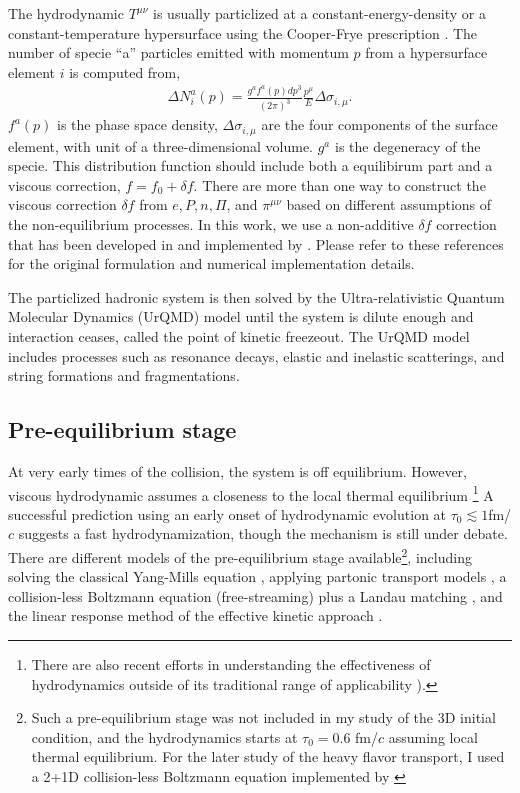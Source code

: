 The hydrodynamic $T^{\mu\nu}$ is usually particlized at a constant-energy-density or a constant-temperature hypersurface using the Cooper-Frye prescription \cite{PhysRevD.10.186}.
The number of specie ``a'' particles emitted with momentum $p$ from a hypersurface element $i$ is computed from,
\begin{eqnarray}
\Delta N_i^a(p) = \frac{g^a f^a(p) dp^3}{(2\pi)^3}  \frac{p^{\mu}}{E} \Delta \sigma_{i,\mu}.
\end{eqnarray}
$f^a(p)$ is the phase space density, $\Delta \sigma_{i,\mu}$ are the four components of the surface element, with unit of a three-dimensional volume. 
$g^a$ is the degeneracy of the specie.
This distribution function should include both a equilibirum part and a viscous correction, $f = f_0 + \delta f$.
There are more than one way to construct the viscous correction $\delta f$  from $e, P, n, \Pi$, and $\pi^{\mu\nu}$ based on different assumptions of the non-equilibrium processes.
In this work, we use a non-additive $\delta f$ correction that has been developed in \cite{Pratt:2010jt,Pratt:2014vja} and implemented by \cite{Bernhard:2018hnz}.
Please refer to these references for the original formulation and numerical implementation details.

The particlized hadronic system is then solved by the Ultra-relativistic Quantum Molecular Dynamics (UrQMD) model \cite{Bass:1998ca,Bleicher:1999xi} until the system is dilute enough and interaction ceases, called the point of kinetic freezeout. 
The UrQMD model includes processes such as resonance decays, elastic and inelastic scatterings, and string formations and fragmentations.

\subsection{Pre-equilibrium stage}
At very early times of the collision, the system is off equilibrium. 
However, viscous hydrodynamic assumes a closeness to the local thermal equilibrium \footnote{\singlespacing There are also recent efforts in understanding the effectiveness of hydrodynamics outside of its traditional range of applicability \cite{PhysRevLett.115.072501,Romatschke:2017vte,Strickland:2019jut}).}
A successful prediction using an early onset of hydrodynamic evolution at $\tau_0\lesssim 1$fm/$c$ suggests a fast hydrodynamization, though the mechanism is still under debate. 
There are different models of the pre-equilibrium stage available\footnote{\singlespacing  Such a pre-equilibrium stage was not included in my study of the 3D initial condition, and the hydrodynamics starts at $\tau_0 = 0.6$ fm/$c$ assuming local thermal equilibrium. For the later study of the heavy flavor transport, I used a 2+1D collision-less Boltzmann equation implemented by \cite{Bernhard:2018hnz}}, including solving the classical Yang-Mills equation \cite{Schenke:2012wb,Schenke:2016ksl}, applying partonic transport models \cite{PhysRevC.97.034915}, a collision-less Boltzmann equation (free-streaming) plus a Landau matching \cite{Liu:2015nwa}, and the linear response method of the effective kinetic approach \cite{Kurkela:2018wud}.

